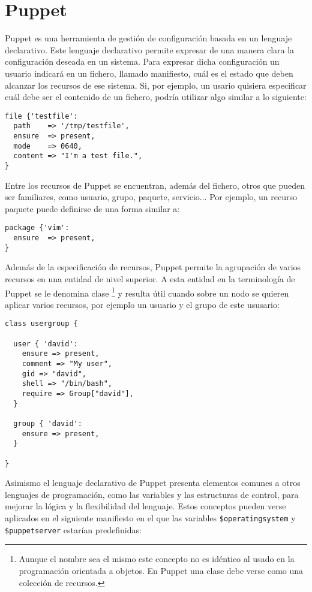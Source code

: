 \chapter{Puppet}
\label{puppet-language}

Puppet es una herramienta de gestión de configuración basada en un lenguaje declarativo. Este lenguaje declarativo permite expresar de una manera clara la configuración deseada en un sistema. Para expresar dicha configuración un usuario indicará en un fichero, llamado manifiesto, cuál es el estado que deben alcanzar los recursos de ese sistema. Si, por ejemplo, un usario quisiera especificar cuál debe ser el contenido de un fichero, podría utilizar algo similar a lo siguiente:

\begin{lstlisting}
file {'testfile':
  path    => '/tmp/testfile',
  ensure  => present,
  mode    => 0640,
  content => "I'm a test file.",
}
\end{lstlisting}

Entre los recursos de Puppet se encuentran, además del fichero, otros que pueden ser familiares, como usuario, grupo, paquete, servicio... Por ejemplo, un recurso paquete puede definirse de una forma similar a:

\begin{lstlisting}
package {'vim':
  ensure  => present,
}
\end{lstlisting}

Además de la especificación de recursos, Puppet permite la agrupación de varios recursos en una entidad de nivel superior. A esta entidad en la terminología de Puppet se le denomina clase \footnote[1]{Aunque el nombre sea el mismo este concepto no es idéntico al usado en la programación orientada a objetos. En Puppet una clase debe verse como una colección de recursos.} y resulta útil cuando sobre un nodo se quieren aplicar varios recursos, por ejemplo un usuario y el grupo de este ususario:

\begin{lstlisting}
class usergroup {

  user { 'david':
    ensure => present,
    comment => "My user",
    gid => "david",
    shell => "/bin/bash",
    require => Group["david"],
  }

  group { 'david':
    ensure => present,
  }

}
\end{lstlisting}

Asimismo el lenguaje declarativo de Puppet presenta elementos comunes a otros lenguajes de programación, como las variables y las estructuras de control, para mejorar la lógica y la flexibilidad del lenguaje. Estos conceptos pueden verse aplicados en el siguiente manifiesto en el que las variables \texttt{\$operatingsystem} y \texttt{\$puppetserver} estarían predefinidas:

